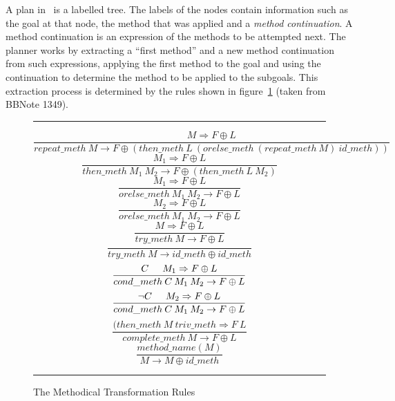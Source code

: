 A plan in \lclam\ is a labelled tree.  The labels of
the nodes contain information such as the goal at that
node, the method that was applied and a {\em method
  continuation}.  A method continuation is
an expression of the methods to be attempted next.  The planner works
by extracting a ``first method'' and a new method continuation from
such expressions, applying the first method to the goal and using the
continuation to determine the method to be applied to the subgoals.
This extraction process is determined by the rules shown in
figure~\ref{fig:continuation_rules} (taken from BBNote
1349).
\begin{figure}[htb]
\hrule
\begin{equation}
\frac{M \Rightarrow F \oplus L}{repeat\_meth \: M \rightarrow F \oplus
  (then\_meth \: L \: (orelse\_meth \: (repeat\_meth \:  M) \: id\_meth))}
\label{repeat_meth}
\end{equation}
\begin{equation}
\frac{M_1 \Rightarrow F \oplus L}{then\_meth \: M_1 \: M_2 \rightarrow F \oplus (then\_meth \: L \: M_2)}
\label{then_meth}
\end{equation}
\begin{equation}
\frac{M_1 \Rightarrow F \oplus L}{orelse\_meth \: M_1 \: M_2 \rightarrow F \oplus L}
\label{orelse_meth1}
\end{equation}
\begin{equation}
\frac{M_2 \Rightarrow F \oplus L}{orelse\_meth \: M_1 \: M_2 \rightarrow F \oplus L}
\label{orelse_meth2}
\end{equation}
\begin{equation}
\frac{M \Rightarrow F \oplus L}{try\_meth \: M \rightarrow F \oplus L}
\label{try_meth1}
\end{equation}
\begin{equation}
\frac{}{try\_meth \: M \rightarrow id\_meth \oplus id\_meth}
\label{try_meth2}
\end{equation}
\begin{equation}
\frac{C \hspace{0.5cm} M_1 \Rightarrow F \oplus L}{cond\_meth \: C \: M_1 \: M_2 \rightarrow F \oplus L}
\label{cond_meth1}
\end{equation}
\begin{equation}
\frac{\neg C \hspace{0.5cm} M_2 \Rightarrow F \oplus L}{cond\_meth \: C \: M_1 \: M_2 \rightarrow F \oplus L}
\label{cond_meth2}
\end{equation}
\begin{equation}
\frac{(then\_meth \: M \: triv\_meth \Rightarrow F \: L}{complete\_meth \: M \rightarrow F \oplus L}
\label{complete_methp}
\end{equation}
\begin{equation}
\frac{method\_name(M)}{M \rightarrow M \oplus id\_meth}
\label{base}
\end{equation}
\hrule
\caption{The Methodical Transformation Rules}
\label{fig:continuation_rules}
\end{figure}

